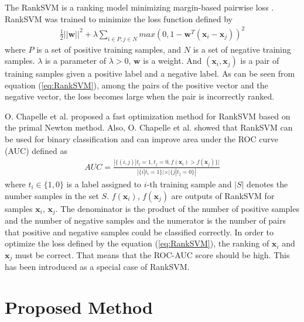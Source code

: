 \documentclass[twocolumn,10pt]{article}
\begin{document}
The RankSVM is a ranking model minimizing margin-based pairwise loss \cite{RankSVM}.
RankSVM was trained to minimize the loss function defined by
\begin{align} \label{eq:RankSVM}
    \frac{1}{2}||{\bm w}||^2+\lambda \sum_{i \in P, j \in N}max(0, 1-{\bm w}^T({\bm x}_i - {\bm x}_j))^2
\end{align}
where $P$ is a set of positive training samples, and $N$ is a set of negative training samples. 
$\lambda$ is a parameter of $\lambda > 0$, ${\bm w}$ is a weight.
And $({\bm x}_i, {\bm x}_j)$ is a pair of training samples given a positive label and a negative label.
As can be seen from equation (\ref{eq:RankSVM}), among the pairs of the positive vector and the negative vector, the loss becomes large when the pair is incorrectly ranked.

O. Chapelle et al. \cite{ROCAUC} proposed a fast optimization method for RankSVM based on the primal Newton method.
Also, O. Chapelle et al. showed that RankSVM can be used for binary classification and can improve area under the ROC curve (AUC) defined as 
\begin{align} \label{eq:AUC}
    AUC=\frac{|\{(i,j)| t_i=1, t_j=0, f({\bm x}_i) > f({\bm x}_j)\}|}{|\{i|t_i=1\}| \times |\{j|t_j=0\}|}
\end{align}
where $t_i \in \{1,0\}$ is a label assigned to $i$-th training sample and $|S|$ denotes the number samples in the set $S$.
$f({\bm x}_i)$, $f({\bm x}_j)$ are outputs of RankSVM for samples ${\bm x}_i$, ${\bm x}_j$.
The denominator is the product of the number of positive samples and the number of negative samples and the numerator is the number of pairs that positive and negative samples could be classified correctly.
In order to optimize the loss defined by the equation (\ref{eq:RankSVM}), the ranking of ${\bm x_i}$ and ${\bm x_j}$ must be correct.
That means that the ROC-AUC score should be high. 
This has been introduced as a special case of RankSVM.

\section{Proposed Method}
\thispagestyle{empty}
\end{document}
